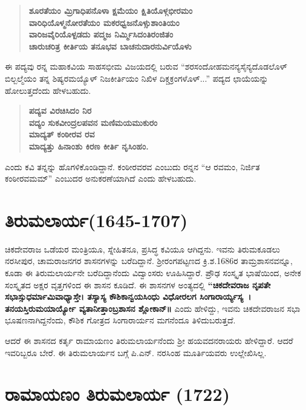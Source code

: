 \begin{verse}
\textbf{ಶೂರತೆಯಂ ಮ್ರಿಗಾಧಿಪನೊಳಾ ಕ್ಷಮೆಯಂ ಕ್ಷಿತಿಯೊಳ್ಗಭೀರಮಂ} \\\textbf{ವಾರಿಧಿಯೊಳ್ಮನೋರತೆಯಂ ಮಕರಧ್ವಜನೊಳ್ಸುಶಾಂತಿಯಂ} \\\textbf{ವಾರಿಜವೈರಿಯೊಳ್ಪಡದು ಪದ್ಮಜ ನಿರ್ಮ್ಮಿಸಿದಂತಿರಂಜಿತಂ} \\\textbf{ಚಾರುಚರಿತ್ರ ಕೀರ್ತಿಯ ತನೂಭವ ಬಾಚನುದಾರನುರ್ವಿಯೊಳು}
\end{verse}

ಈ ಪದ್ಯವು ರನ್ನ ಮಹಾಕವಿಯ ಸಾಹಸಭೀಮ ವಿಜಯದಲ್ಲಿ ಬರುವ “ಶರಸಂದೋಹಮನನ್ಯಸೈನ್ಯದೊಡಲೊಳ್​ ಬಿಲ್ಬಲ್ಮೆಯಂ ತನ್ನ ಶಿಷ್ಯರಮಯ್ಯೊಳ್​ ನಿಜಕೀರ್ತಿಯಂ ನಿಖಿಳ ದಿಕ್ಚಕ್ರಂಗಳೊಳ್​...” ಪದ್ಯದ ಛಾಯೆಯನ್ನು ಹೋಲುತ್ತದೆಂದು ಹೇಳಬಹುದು.

\begin{verse}
\textbf{ಪದ್ಯವ ವಿರಚಿಸಿದಂ ನಿರ} \\\textbf{ವದ್ಯಂ ಸುಕವೀಂದ್ರಲಪವನ ಮಣಿಮಯಮುಕುರಂ} \\\textbf{ಮಾದ್ಯತ್​ ಕಂಠೀರವ ರವ} \\\textbf{ಮಾದ್ಯತ್ತು ಹಿನಾಂಶು ಕಿರಣ ಕೀರ್ತಿ ನೃಸಿಂಹಂ.}
\end{verse}

ಎಂದು ಕವಿ ತನ್ನನ್ನು ಹೊಗಳಿಕೊಂಡಿದ್ದಾನೆ. ಕಂಠೀರವರವ ಎಂಬುದು ರನ್ನನ “ಆ ರವಮಂ, ನಿರ್ಜಿತ ಕಂಠೀರವಮಮ್” ಎಂಬುದರ ಅನುಕರಣೆಯಾಗಿದೆ ಎಂದು ಹೇಳಬಹುದು.


\section{ತಿರುಮಲಾರ್ಯ(1645-1707)}

ಚಿಕದೇವರಾಜ ಒಡೆಯರ ಮಂತ್ರಿಯೂ, ಸ್ನೇಹಿತನೂ, ಪ್ರಸಿದ್ಧ ಕವಿಯೂ ಆಗಿದ್ದನು. ಇವನು ತಿರುಮಕೂಡಲು ನರಸೀಪುರ, ಚಾಮರಾಜನಗರ ಶಾಸನಗಳನ್ನು ಬರೆದಿದ್ದಾನೆ. ಶ‍್ರೀರಂಗಪಟ್ಟಣದ ಕ್ರಿ.ಶ.1686ರ ತಾಮ್ರಶಾಸನವನ್ನೂ, ಕೂಡಾ ಈ ತಿರುಮಲಾರ್ಯನೇ ಬರೆದಿದ್ದಾನೆಂದು ವಿದ್ವಾಂಸರು ಊಹಿಸಿದ್ದಾರೆ. ಪ್ರೌಢ ಸಂಸ್ಕೃತ ಭಾಷೆಯಿಂದ, ಅನೇಕ ಸಂಸ್ಕೃತದ ಅಕ್ಷರ ವೃತ್ತಗಳಿಂದ ಈ ಶಾಸನ ಕೂಡಿದೆ. ಈ ಶಾಸನಗಳ ಅಂತ್ಯದಲ್ಲಿ \textbf{“ಚಿಕದೇವರಾಜ ನೃಪತೇ ಸಭಾಸ್ಸುಧರ್ಮಾಮಿವಾಧ್ಯಾಸ್ತೇ। ತಸ್ಯಾಸ್ಯ ಕೌಶಿಕಾನ್ವಯಸಿಂಧು ವಿಧೋರಲಗ ಸಿಂಗಾರಾರ್ಯ್ಯಸ್ಯ~। ತನಯಸ್ತಿರುಮಯಾರ್ಯ್ಯೋ ವ್ಯತಾನೀತ್ತಾಂಬ್ರಶಾಸನ ಶ್ಲೋಕಾನ್​॥} ಎಂದು ಹೇಳಿದ್ದು, ಇವನು ಚಿಕದೇವರಾಜನ ಸಭಾ ಭೂಷಣನಾಗಿದ್ದನೆಂದು, ಕೌಶಿಕ ಗೋತ್ರದ ಸಿಂಗಾರಾರ್ಯನ ಮಗನೆಂದೂ ತಿಳಿದುಬರುತ್ತದೆ.

ಆದರೆ ಈ ಶಾಸನದ ಕರ್ತೃ ರಾಮಾಯಣಂ ತಿರುಮಲಾರ್ಯನೆಂದು ಶ‍್ರೀ ಹಯವದನರಾಯರು ಹೇಳಿದ್ದಾರೆ. ಆದರೆ ಇವರಿಬ್ಬರೂ ಬೇರೆ. ಈ ತಿರುಮಲಾರ್ಯನ ಬಗ್ಗೆ ಪಿ.ಎನ್​. ನರಸಿಂಹ ಮೂರ್ತಿಯವರು ಉಲ್ಲೇಖಿಸಿಲ್ಲ.


\section{ರಾಮಾಯಣಂ ತಿರುಮಲಾರ್ಯ (1722)}

